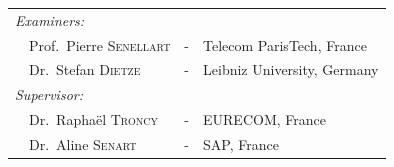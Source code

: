 {\begin{titlepage}
\begin{center}
\begin{tabular}{llcl}
\\
      \textit{Examiners:}&    & & \\
\multicolumn{2}{l}{~~Prof.\ Pierre \textsc{Senellart}}           & - &  Telecom ParisTech, France \\
\multicolumn{2}{l}{~~Dr.\ Stefan \textsc{Dietze}}           & - &   Leibniz University, Germany \\

\textit{Supervisor:}&     & & \\
\multicolumn{2}{l}{~~Dr.\ Rapha\"el \textsc{Troncy}} & - & EURECOM, France \\
\multicolumn{2}{l}{~~Dr.\ Aline \textsc{Senart}}     & - & SAP, France \\

\end{tabular}
\end{center}

\end{titlepage}

}
